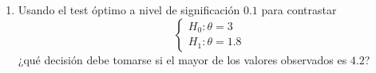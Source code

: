 \documentclass[12pt]{article}
\begin{document}
\begin{ejercicio}
\begin{enumerate}[label=\alph*)]
            y la potencia es $$\beta_{\varphi}(\theta_1) = \alpha \left( \dfrac{3}{\theta_1} \right)^{n}$$

            En particular si $n=4$ y $\alpha = 0.05$, imponemos
            $$0.05 = \alpha \leq \left( \dfrac{\theta_1}{3} \right)^{4} = \dfrac{\theta_1^4}{81} \iff \theta_1^4 \geq 0.05 \cdot 81 = 4,05 \iff
            \theta_1 \geq \sqrt[4]{4,05} \approx 1,4186$$

            e imponemos la restricción sobre la potencia 
            $$\beta_{\varphi}(\theta_1) \geq 0,8 \iff \dfrac{4,05}{\theta_1^4} = 0,05 \left( \dfrac{3}{\theta_1} \right)^{4}  = \alpha \left( \dfrac{3}{\theta_1} \right)^{n} \geq 0,8 \iff $$
            $$\theta_1 \leq \sqrt[4]{\dfrac{4,05}{0,8}} = 1,5$$

            Combinando ambas condiciones, obtenemos
            $$1,4186 \leq \theta_1 \leq 1,5$$
            Y concluimos entonces que el rango de valores será $\left[\sqrt[4]{4,05}, 1{.}5\right]$.

            \item Usando el test óptimo a nivel de significación $0.1$ para contrastar
            \begin{equation*}
                \left\{\begin{array}{l}
                    H_0: \theta = 3 \\
                    H_1 : \theta = 1.8
                \end{array}\right.
            \end{equation*}
            ¿qué decisión debe tomarse si el mayor de los valores observados es $4.2$? \\


\end{enumerate}
\end{ejercicio}
\end{document}
